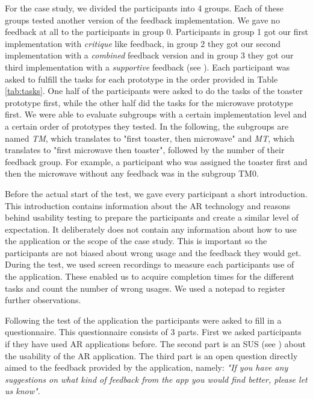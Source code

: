 \documentclass[11pt, a4paper]{article}
\begin{document}
			For the case study, we divided the participants into 4 groups. Each of these groups tested another version of the feedback implementation. We gave no feedback at all to the participants in group 0. Participants in group 1 got our first implementation with \emph{critique} like feedback, in group 2 they got our second implementation with a \emph{combined} feedback version and in group 3 they got our third implementation with a \emph{supportive} feedback (see ). Each participant was asked to fulfill the tasks for each prototype in the order provided in Table \ref{tab:tasks}. One half of the participants were asked to do the tasks of the toaster prototype first, while the other half did the tasks for the microwave prototype first. We were able to evaluate subgroups with a certain implementation level and a certain order of prototypes they tested. In the following, the subgroups are named \emph{TM}, which translates to "first toaster, then microwave" and \emph{MT}, which translates to "first microwave then toaster", followed by the number of their feedback group. For example, a participant who was assigned the toaster first and then the microwave without any feedback was in the subgroup TM0.

			Before the actual start of the test, we gave every participant a short introduction. This introduction contains information about the \ac{AR} technology and reasons behind usability testing to prepare the participants and create a similar level of expectation. It deliberately does not contain any information about how to use the application or the scope of the case study. This is important so the participants are not biased about wrong usage and the feedback they would get. During the test, we used screen recordings to measure each participants use of the application. These enabled us to acquire completion times for the different tasks and count the number of wrong usages. We used a notepad to register further observations.

			Following the test of the application the participants were asked to fill in a questionnaire. This questionnaire consists of 3 parts. First we asked participants if they have used \ac{AR} applications before. The second part is an \ac{SUS} (see ) about the usability of the \ac{AR} application. The third part is an open question directly aimed to the feedback provided by the application, namely: \emph{"If you have any suggestions on what kind of feedback from the app you would find better, please let us know"}.
\end{document}
